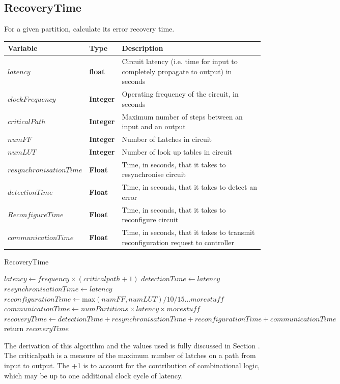 \documentclass[12pt,final,oneside]{article} %
\begin{document}
\newpage
\subsection{RecoveryTime}
For a given partition, calculate its error recovery time.
\begin{algorithm}
   \begin{center}
        \begin{tabularx}{\linewidth}{llX}
        \toprule
        Variable & Type & Description\\
        \midrule
        $latency$ &\bf  float & Circuit latency (i.e. time for input to completely propagate to output) in seconds\\
        $clockFrequency$ &\bf  Integer & Operating frequency of the circuit, in seconds\\
        $criticalPath$ &\bf  Integer & Maximum number of steps between an input and an output\\
        $numFF$ &\bf  Integer & Number of Latches in circuit\\
        $numLUT$ &\bf  Integer & Number of look up tables in circuit\\
        $resynchronisationTime$ &\bf  Float & Time, in seconds, that it takes to resynchronise circuit\\
        $detectionTime$ &\bf  Float & Time, in seconds, that it takes to detect an error\\
        $ReconfigureTime$ &\bf  Float & Time, in seconds, that it takes to reconfigure circuit\\
        $communicationTime$ &\bf  Float & Time, in seconds, that it takes to transmit reconfiguration request to controller\\
        \bottomrule
        \end{tabularx}
    \end{center}
   \caption{RecoveryTime}\label{recoverytime}
   \begin{algorithmic}[1]
            \State $latency \gets frequency\times{}(criticalpath+1)$
            \State $detectionTime \gets latency$
            \State $resynchronisationTime \gets latency$
            \State $reconfigurationTime \gets \mbox{max}(numFF, numLUT)/10/15...more stuff$
            \State $communicationTime \gets numPartitions\times{}latency\times{}more stuff$
            \State $recoveryTime \gets detectionTime+resynchronisationTime+reconfigurationTime+communicationTime$
            \State return $recoveryTime$
         \EndProcedure
   \end{algorithmic}
\end{algorithm}
The derivation of this algorithm and the values used is fully discussed in Section . The criticalpath is a measure of the maximum number of latches on a path from input to output. The +1 is to account for the contribution of combinational logic, which may be up to one additional clock cycle of latency.
\end{document}
